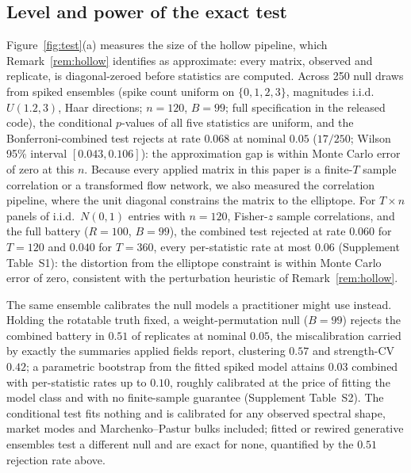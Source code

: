 \subsection{Level and power of the exact test}
\label{sec:exp-test}

Figure~\ref{fig:test}(a) measures the size of the hollow pipeline,
which Remark~\ref{rem:hollow} identifies as approximate: every matrix,
observed and replicate, is diagonal-zeroed before statistics are
computed. Across 250 null draws from spiked ensembles (spike count uniform on
$\{0,1,2,3\}$, magnitudes i.i.d.\ $U(1.2,3)$, Haar directions;
$n=120$, $B=99$; full specification in the released code), the conditional $p$-values of all
five statistics are uniform, and the Bonferroni-combined test rejects
at rate $0.068$ at nominal $0.05$ ($17/250$; Wilson 95\% interval
$[0.043,0.106]$): the approximation gap is within Monte Carlo error of
zero at this $n$. Because every applied matrix in this paper is a
finite-$T$ sample correlation or a transformed flow network, we also
measured the correlation pipeline, where the unit diagonal constrains
the matrix to the elliptope. For $T\times n$
panels of i.i.d.\ $N(0,1)$ entries with $n=120$, Fisher-$z$ sample
correlations, and the full battery ($R=100$, $B=99$), the combined test rejected at rate $0.060$ for $T=120$ and $0.040$
for $T=360$, every per-statistic rate at most $0.06$ (Supplement
Table~S1): the distortion from the elliptope constraint is within
Monte Carlo error of zero, consistent with the perturbation heuristic
of Remark~\ref{rem:hollow}.

The same ensemble calibrates the null models a practitioner might use
instead. Holding the rotatable truth fixed, a weight-permutation null
($B=99$) rejects the combined battery in $0.51$ of replicates at
nominal $0.05$, the miscalibration carried by exactly the summaries
applied fields report, clustering $0.57$ and strength-CV $0.42$; a
parametric bootstrap from the fitted spiked model attains $0.03$
combined with per-statistic rates up to $0.10$, roughly calibrated at
the price of fitting the model class and with no finite-sample
guarantee (Supplement Table~S2). The conditional test fits nothing and
is calibrated for any observed spectral shape, market modes and
Marchenko--Pastur bulks included; fitted or rewired generative
ensembles \citep{maslov2002specificity} test a different null and are
exact for none, quantified by the $0.51$ rejection rate above.

